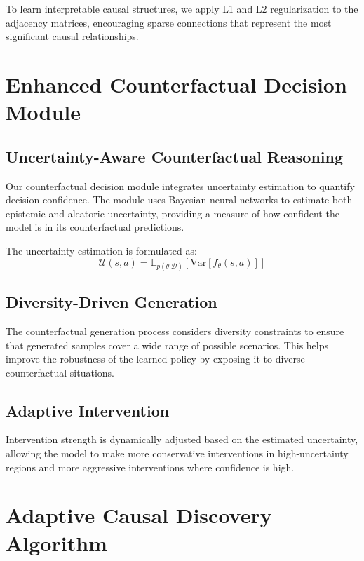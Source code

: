 \documentclass[12pt]{article}
\begin{document}
To learn interpretable causal structures, we apply L1 and L2 regularization to the adjacency matrices, encouraging sparse connections that represent the most significant causal relationships.

\section{Enhanced Counterfactual Decision Module}

\subsection{Uncertainty-Aware Counterfactual Reasoning}

Our counterfactual decision module integrates uncertainty estimation to quantify decision confidence. The module uses Bayesian neural networks to estimate both epistemic and aleatoric uncertainty, providing a measure of how confident the model is in its counterfactual predictions.

The uncertainty estimation is formulated as:
\begin{equation}
\mathcal{U}(s, a) = \mathbb{E}_{p(\theta|\mathcal{D})}[\text{Var}[f_\theta(s, a)]]
\end{equation}

\subsection{Diversity-Driven Generation}

The counterfactual generation process considers diversity constraints to ensure that generated samples cover a wide range of possible scenarios. This helps improve the robustness of the learned policy by exposing it to diverse counterfactual situations.

\subsection{Adaptive Intervention}

Intervention strength is dynamically adjusted based on the estimated uncertainty, allowing the model to make more conservative interventions in high-uncertainty regions and more aggressive interventions where confidence is high.

\section{Adaptive Causal Discovery Algorithm}
\end{document}
